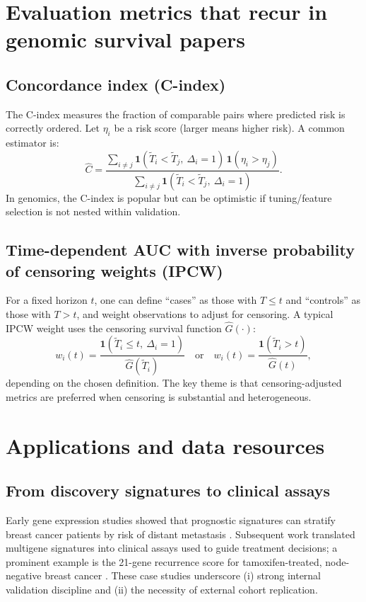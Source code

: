 \documentclass[11pt]{article}
\begin{document}
\section{Evaluation metrics that recur in genomic survival papers}
\subsection{Concordance index (C-index)}
The C-index measures the fraction of comparable pairs where predicted risk is correctly ordered. Let $\eta_i$ be a risk score (larger means higher risk). A common estimator is:
\begin{equation}
\widehat{C}
=
\frac{\sum_{i\ne j}\mathbf{1}(\tilde T_i < \tilde T_j,\ \Delta_i=1)\,\mathbf{1}(\eta_i>\eta_j)}
{\sum_{i\ne j}\mathbf{1}(\tilde T_i < \tilde T_j,\ \Delta_i=1)}.
\label{eq:cindex}
\end{equation}
In genomics, the C-index is popular but can be optimistic if tuning/feature selection is not nested within validation.

\subsection{Time-dependent AUC with inverse probability of censoring weights (IPCW)}
For a fixed horizon $t$, one can define ``cases'' as those with $T\le t$ and ``controls'' as those with $T>t$, and weight observations to adjust for censoring. A typical IPCW weight uses the censoring survival function $\hat G(\cdot)$:
\[
w_i(t)=\frac{\mathbf{1}(\tilde T_i \le t,\ \Delta_i=1)}{\hat G(\tilde T_i)}
\quad\text{or}\quad
w_i(t)=\frac{\mathbf{1}(\tilde T_i > t)}{\hat G(t)},
\]
depending on the chosen definition. The key theme is that censoring-adjusted metrics are preferred when censoring is substantial and heterogeneous.

\section{Applications and data resources}
\subsection{From discovery signatures to clinical assays}
Early gene expression studies showed that prognostic signatures can stratify breast cancer patients by risk of distant metastasis \citep{VantVeer2002}. Subsequent work translated multigene signatures into clinical assays used to guide treatment decisions; a prominent example is the 21-gene recurrence score for tamoxifen-treated, node-negative breast cancer \citep{Paik2004}. These case studies underscore (i) strong internal validation discipline and (ii) the necessity of external cohort replication.
\end{document}
